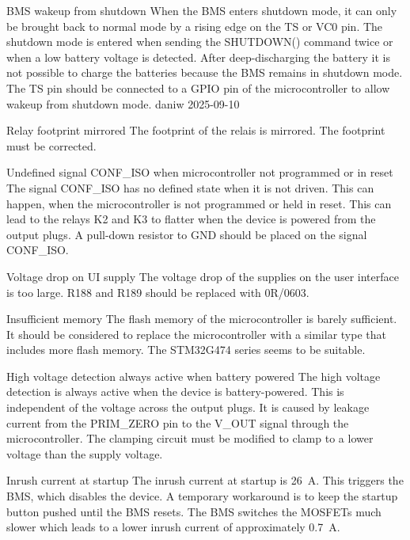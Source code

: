 \begin{ModTable}

\ModItemDone
{\acs{BMS} wakeup from shutdown}
{When the \ac{BMS} enters shutdown mode, it can only be brought back to normal mode by a rising edge on the TS or VC0 pin. The shutdown mode is entered when sending the SHUTDOWN() command twice or when a low battery voltage is detected. After deep-discharging the battery it is not possible to charge the batteries because the \ac{BMS} remains in shutdown mode. }
{The TS pin should be connected to a GPIO pin of the microcontroller to allow wakeup from shutdown mode. }
{daniw}
{2025-09-10}

\ModItemOpen
{Relay footprint mirrored}
{The footprint of the relais is mirrored. }
{The footprint must be corrected. }
{}
{}

\ModItemOpen
{Undefined signal CONF\_ISO when microcontroller not programmed or in reset}
{The signal CONF\_ISO has no defined state when it is not driven. This can happen, when the microcontroller is not programmed or held in reset. This can lead to the relays K2 and K3 to flatter when the device is powered from the output plugs. }
{A pull-down resistor to GND should be placed on the signal CONF\_ISO. }
{}
{}

\ModItemOpen
{Voltage drop on UI supply}
{The voltage drop of the supplies on the user interface is too large. }
{R188 and R189 should be replaced with 0R/0603. }
{}
{}

\ModItemOpen
{Insufficient memory}
{The flash memory of the microcontroller is barely sufficient. }
{It should be considered to replace the microcontroller with a similar type that includes more flash memory. The STM32G474 series seems to be suitable. }
{}
{}

\ModItemOpen
{High voltage detection always active when battery powered}
{The high voltage detection is always active when the device is battery-powered. This is independent of the voltage across the output plugs. It is caused by leakage current from the PRIM\_ZERO pin to the V\_OUT signal through the microcontroller. }
{The clamping circuit must be modified to clamp to a lower voltage than the supply voltage. }
{}
{}

\ModItemOpen
{Inrush current at startup}
{The inrush current at startup is \qty{26}{\ampere}. This triggers the \ac{BMS}, which disables the device. }
{A temporary workaround is to keep the startup button pushed until the \ac{BMS} resets. The \ac{BMS} switches the \acp{MOSFET} much slower which leads to a lower inrush current of approximately \qty{0.7}{\ampere}. }
{}
{}


\end{ModTable}

